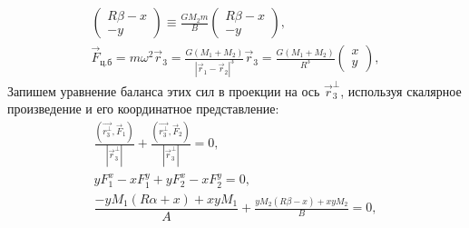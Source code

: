{\begin{gather*}
\begin{pmatrix}
R\beta - x\\
-y
\end{pmatrix} \equiv \frac{G M_2 m}{B}\begin{pmatrix}
R\beta - x\\
-y
\end{pmatrix},\\
\vec{F}_\text{ц.б} = m\omega^2 \vec{r}_3 = \frac{G (M_1 + M_2)}{|\vec{r}_1 - \vec{r}_2|^3} \vec{r}_3 = \frac{G(M_1 + M_2)}{R^3} \begin{pmatrix}
x\\
y
\end{pmatrix},
\end{gather*}
Запишем уравнение баланса этих сил в проекции на ось $\vec{r}_3^\perp$, используя скалярное произведение и его координатное представление:
\begin{gather*}
\frac{ \left( \vec{r_3^\perp},  \vec{F}_1 \right)}{\left| \vec{r}_3^\perp \right|} + \frac{ \left( \vec{r_3^\perp}, \vec{F}_2 \right)}{\left| \vec{r}_3^\perp \right|} = 0,\\
y F_1^x - x F_1^y + y F_2^x - x F_2^y = 0,\\
\dfrac{-y M_1 (R\alpha + x ) + x y M_1}{A} 	+ \frac{y M_2(R\beta - x) + xy  M_2}{B}= 0,\\

\end{gather*}}
